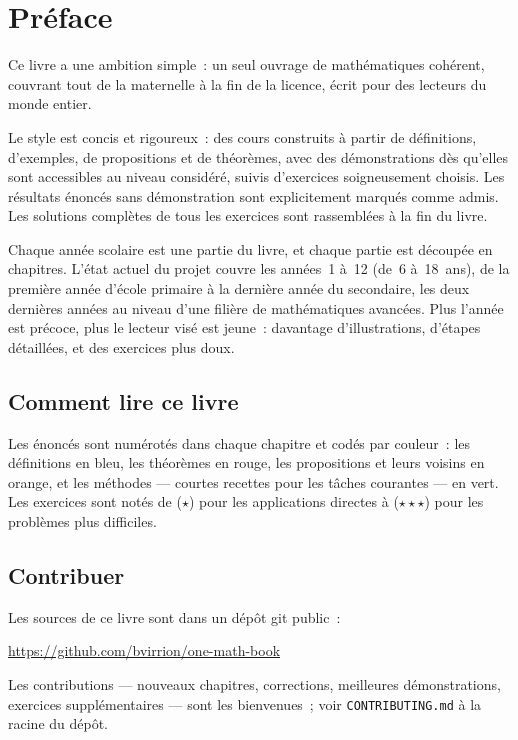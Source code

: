 \chapter{Préface}

Ce livre a une ambition simple~: un seul ouvrage de mathématiques cohérent,
couvrant tout de la maternelle à la fin de la licence, écrit pour des
lecteurs du monde entier.

Le style est concis et rigoureux~: des cours construits à partir de
définitions, d'exemples, de propositions et de théorèmes, avec des
démonstrations dès qu'elles sont accessibles au niveau considéré, suivis
d'exercices soigneusement choisis. Les résultats énoncés sans démonstration
sont explicitement marqués comme admis. Les solutions complètes de tous les
exercices sont rassemblées à la fin du livre.

Chaque année scolaire est une partie du livre, et chaque partie est découpée
en chapitres. L'état actuel du projet couvre les années~1 à~12 (de~6 à~18~ans),
de la première année d'école primaire à la dernière année du secondaire, les
deux dernières années au niveau d'une filière de mathématiques avancées. Plus
l'année est précoce, plus le lecteur visé est jeune~: davantage
d'illustrations, d'étapes détaillées, et des exercices plus doux.

\section*{Comment lire ce livre}

Les énoncés sont numérotés dans chaque chapitre et codés par couleur~: les
définitions en bleu, les théorèmes en rouge, les propositions et leurs
voisins en orange, et les méthodes --- courtes recettes pour les tâches
courantes --- en vert. Les exercices sont notés de ($\star$) pour les
applications directes à ($\star\star\star$) pour les problèmes plus
difficiles.

\section*{Contribuer}

Les sources de ce livre sont dans un dépôt git public~:
\begin{center}
\url{https://github.com/bvirrion/one-math-book}
\end{center}
Les contributions --- nouveaux chapitres, corrections, meilleures
démonstrations, exercices supplémentaires --- sont les bienvenues~; voir
\texttt{CONTRIBUTING.md} à la racine du dépôt.
